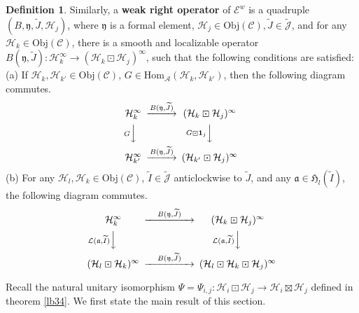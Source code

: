 \documentclass[11pt,b5paper,notitlepage]{article}
\theoremstyle{definition}
\newtheorem{df}{Definition}[subsection]
\theoremstyle{plain}
\newcommand{\fk}{\mathfrak}
\newcommand{\mc}{\mathcal}
\newcommand{\wtd}{\widetilde}
\newcommand{\id}{\mathbf{1}}
\newcommand{\Hom}{\mathrm{Hom}}
\newcommand{\scr}{\mathscr}
\newcommand{\Jtd}{\widetilde{\mathcal J}}
\newcommand{\Obj}{\mathrm{Obj}}
\numberwithin{equation}{subsection}
\begin{document}
\begin{df}
	Similarly, a \textbf{weak right operator} of $\scr E^w$ is a quadruple $(B,\fk y,\wtd J,\mc H_j)$, where $\fk y$ is a formal element, $\mc H_j\in\Obj(\scr C),\wtd J\in\Jtd$, and for any $\mc H_k\in\Obj(\scr C)$, there is a smooth and localizable operator $B(\fk y,\wtd J):\mc H_k^\infty\rightarrow(\mc H_k\boxdot\mc H_j)^\infty$, such that the following conditions are satisfied:\\
	(a) If $\mc H_k,\mc H_{k'}\in\Obj(\scr C)$, $G\in\Hom_{\mc A}(\mc H_k,\mc H_{k'})$, then  the following diagram commutes.
	\begin{gather}
	\begin{CD}
	\mc H_k^\infty  @> B(\fk y,\wtd J)  >> (\mc H_k\boxdot\mc H_j)^\infty\\
	@V G VV @V G\boxdot\id_j  VV\\
	\mc H_{k'}^\infty @>B(\fk y,\wtd J) >> (\mc H_{k'}\boxdot\mc H_j)^\infty
	\end{CD}
	\end{gather}
	(b) For any $\mc H_l,\mc H_k\in\Obj(\scr C)$,  $\wtd I\in\Jtd$  anticlockwise to $\wtd J$, and any $\fk a\in\fk H_l(\wtd I)$, the following diagram  commutes.
	\begin{align}
	\begin{CD}
	\mc H_k^\infty @> \quad B(\fk y,\wtd J)\quad   >> (\mc H_k\boxdot\mc H_j)^\infty\\
	@V \mc L(\fk a,\wtd I)   V  V @V \mc L(\fk a,\wtd I) VV\\
(\mc H_l\boxdot\mc H_k)^\infty @> \quad B(\fk y,\wtd J) \quad  >> (\mc H_l\boxdot\mc H_k\boxdot\mc H_j)^\infty
	\end{CD}
	\end{align}
\end{df}

Recall the natural unitary isomorphism $\Psi=\Psi_{i,j}:\mc H_i\boxdot\mc H_j\rightarrow\mc H_i\boxtimes\mc H_j$ defined in theorem \ref{lb34}. We first state the main result of this section.
\end{document}
